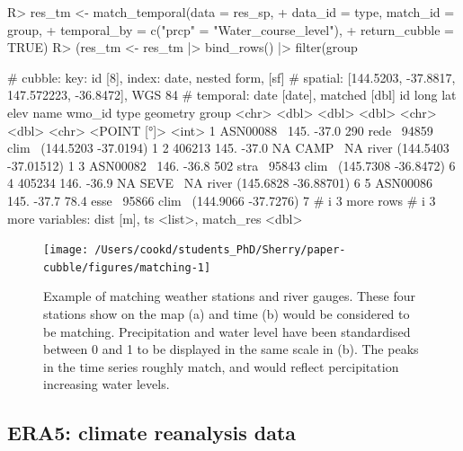 \documentclass[
  shortnames]{jss}
\begin{document}
\begin{CodeChunk}
\begin{CodeInput}
R> res_tm <- match_temporal(data =  res_sp,
+                          data_id = type, match_id = group,
+                          temporal_by = c("prcp" = "Water_course_level"),
+                          return_cubble = TRUE)
R> (res_tm <- res_tm |> bind_rows() |> filter(group %
\end{CodeInput}
\begin{CodeOutput}
# cubble:   key: id [8], index: date, nested form, [sf]
# spatial:  [144.5203, -37.8817, 147.572223, -36.8472], WGS 84
# temporal: date [date], matched [dbl]
  id         long   lat  elev name  wmo_id type              geometry group
  <chr>     <dbl> <dbl> <dbl> <chr>  <dbl> <chr>          <POINT [°]> <int>
1 ASN00088~  145. -37.0 290   rede~  94859 clim~  (144.5203 -37.0194)     1
2 406213     145. -37.0  NA   CAMP~     NA river (144.5403 -37.01512)     1
3 ASN00082~  146. -36.8 502   stra~  95843 clim~  (145.7308 -36.8472)     6
4 405234     146. -36.9  NA   SEVE~     NA river (145.6828 -36.88701)     6
5 ASN00086~  145. -37.7  78.4 esse~  95866 clim~  (144.9066 -37.7276)     7
# i 3 more rows
# i 3 more variables: dist [m], ts <list>, match_res <dbl>
\end{CodeOutput}
\end{CodeChunk}

\begin{CodeChunk}
\begin{figure}

{\centering \texttt{[image: /Users/cookd/students\_PhD/Sherry/paper-cubble/figures/matching-1]} 

}

\caption[Example of matching weather stations and river gauges]{Example of matching weather stations and river gauges. These four stations show on the map (a) and time (b) would be considered to be matching. Precipitation and water level have been standardised between 0 and 1 to be displayed in the same scale in (b). The peaks in the time series roughly match, and would reflect percipitation increasing water levels.}\label{fig:matching}
\end{figure}
\end{CodeChunk}

\hypertarget{era5-climate-reanalysis-data}{%
\subsection{ERA5: climate reanalysis data}\label{era5-climate-reanalysis-data}}
\end{document}
